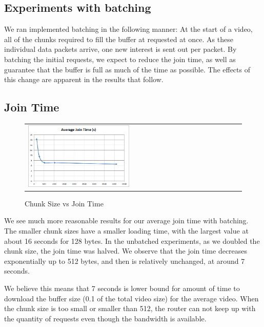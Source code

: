 \subsection{Experiments with batching} \label{sec:batch}

We ran implemented batching in the following manner: At the start of a video,
all of the chunks required to fill the buffer at requested at once. As these
individual data packets arrive, one new interest is sent out per packet. By
batching the initial requests, we expect to reduce the join time, as well as
guarantee that the buffer is full as much of the time as possible. The effects
of this change are apparent in the results that follow.

\subsection{Join Time} \label{sec:join}

\begin{figure}[!htbp]
    \begin{center}
        \begin{tabular}{l}
            \includegraphics[width=0.48\textwidth]{fig/join.png}
            \\
        \end{tabular}
        \caption{Chunk Size vs Join Time}
        \label{fig:join}
    \end{center}
\end{figure}

We see much more reasonable results for our average join time with batching. The
smaller chunk sizes have a smaller loading time, with the largest value at about
16 seconds for 128 bytes. In the unbatched experiments, as we doubled the chunk
size, the join time was halved. We observe that the join time decreases
exponentially up to 512 bytes, and then is relatively unchanged, at around 7
seconds.

We believe this means that 7 seconds is lower bound for amount of time to download
the buffer size (0.1 of the total video size) for the average video. When the
chunk size is too small or smaller than 512, the router can not keep up with the
quantity of requests even though the bandwidth is available.


